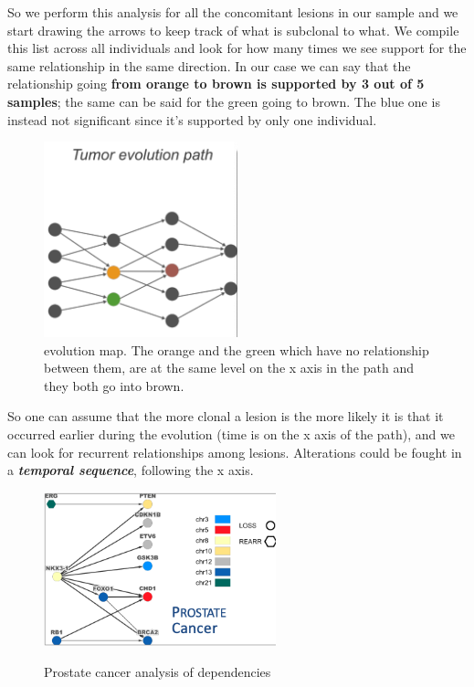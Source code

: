 So we perform this analysis for all the concomitant lesions in our sample and we
start drawing the arrows to keep track of what is subclonal to what. We compile
this list across all individuals and look for how many times we see support for
the same relationship in the same direction. In our case we can say that the relationship going \textbf{from orange to brown is
supported by 3 out of 5 samples}; the same can be said for the green going to
brown. The blue one is instead not significant since it's supported by only one
individual.

\begin{figure}[H]
  \caption{evolution map. The orange and the green which have no relationship between them, are at the
  same level on the x axis in the path and they both go into brown.}
  \centering
  \includegraphics[width=0.5\textwidth]{image5}
\end{figure}



So one can assume that the more clonal a lesion is the more likely it is that it
occurred earlier during the evolution (time is on the x axis of the path), and
we can look for recurrent relationships among lesions.
Alterations could be fought in a \textit{\textbf{temporal sequence}}, following the x axis.

\begin{figure}[H]
  \caption{Prostate cancer analysis of dependencies}
  \centering
  \includegraphics[width=0.6\textwidth]{image6}
  \label{fig: prostate cancer}
\end{figure}

